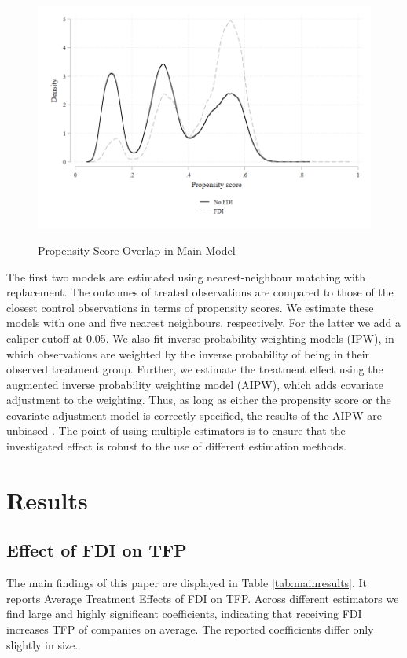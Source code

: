 \documentclass[a4paper,11pt]{scrartcl}
\begin{document}
\begin{figure}[h!]
	\centering
	\caption{Propensity Score Overlap in Main Model}
	\includegraphics[width=\textwidth]{graph}
  	\label{fig:graph}
\end{figure} 
\FloatBarrier

\newpage

The first two models are estimated using nearest-neighbour matching with replacement. The outcomes of treated observations are compared to those of the closest control observations in terms of propensity scores. We estimate these models with one and five nearest neighbours, respectively. For the latter we add a caliper cutoff at 0.05. We also fit inverse probability weighting models (IPW), in which observations are weighted by the inverse probability of being in their observed treatment group. Further, we estimate the treatment effect using the augmented inverse probability weighting model (AIPW), which adds covariate adjustment to the weighting. Thus, as long as either the propensity score or the covariate adjustment model is correctly specified, the results of the AIPW are unbiased \citep[p.~393]{imbens2015}. The point of using multiple estimators is to ensure that the investigated effect is robust to the use of different estimation methods.

\section{Results}

\subsection{Effect of FDI on TFP}
The main findings of this paper are displayed in Table \ref{tab:mainresults}. It reports Average Treatment Effects of FDI on TFP. Across different estimators we find large and highly significant coefficients, indicating that receiving FDI increases TFP of companies on average. The reported coefficients differ only slightly in size. 
\end{document}
